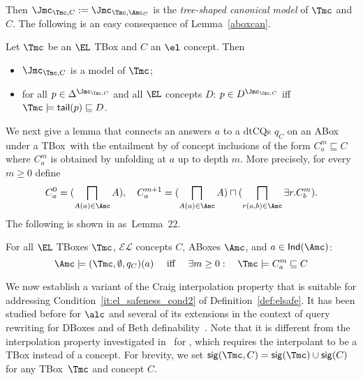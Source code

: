 \documentclass{lmcs}
\theoremstyle{definition}
\begin{document}
%
Then $\Jmc_{\Tmc,C}:= \Jmc_{\Tmc,\Amc_{C}}$ is the \emph{tree-shaped canonical model} of $\Tmc$ and $C$. 
The following is an easy consequence of Lemma~\ref{aboxcan}.
%
\begin{lem}\label{conceptcan}
  Let $\Tmc$ be an $\EL$ TBox and $C$ an $\el$ concept. Then
  \begin{itemize}
  \item $\Jmc_{\Tmc,C}$ is a model of $\Tmc$;
  \item for all $p\in \Delta^{\Jmc_{\Tmc,C}}$ and all $\EL$ concepts
    $D$: $p\in D^{\Jmc_{\Tmc,C}}$ iff $\Tmc \models {\sf
      tail}(p)\sqsubseteq D$.
  \end{itemize}
\end{lem}
%
We next give a lemma that connects an answers $a$
to a dtCQs $q_C$
on an ABox \Amc under a TBox~\Tmc with the entailment by \Tmc of
concept inclusions of the form $C_a^m
\sqsubseteq C$ where $C_a^m$ is obtained by unfolding \Amc at
$a$ up to depth $m$. More precisely, for every $m \geq 0$ define
%
$$
C_{a}^{0} = (\bigsqcap_{A(a)\in \Amc} A), \quad C_{a}^{m+1}=
(\bigsqcap_{A(a)\in \Amc} A)\sqcap (\bigsqcap_{r(a,b)\in \Amc} \exists
r.C_{b}^{m}).
$$
The following is shown in \cite{jlc} as~Lemma~22.
%
\begin{lem}\label{ac}
For all $\EL$ TBoxes $\Tmc$, $\mathcal{EL}$ concepts $C$, ABoxes $\Amc$, and $a\in {\sf Ind}(\Amc)$:
$$
\Amc\models (\Tmc,\emptyset,q_{C})(a) \quad \text{ iff } \quad \exists m\geq 0: \quad
\Tmc\models C_{a}^{m}\sqsubseteq C
$$
\end{lem}
%
We now establish a variant of the Craig interpolation property that is
suitable for addressing Condition~\ref{it:el_safeness_cond2} of
Definition~\ref{def:elsafe}. It has been studied before for $\alc$
and several of its extensions in the context of query rewriting for
DBoxes and of Beth definability~\cite{seylan09effective,tencate13beth}.
Note that it is different from the interpolation property investigated
in~\cite{jlc} for \el, which requires the interpolant to be a TBox
instead of a concept. For brevity, we set ${\sf
  sig}(\Tmc,C)={\sf sig}(\Tmc)\cup {\sf sig}(C)$ for any TBox~$\Tmc$ and concept $C$.
\end{document}
